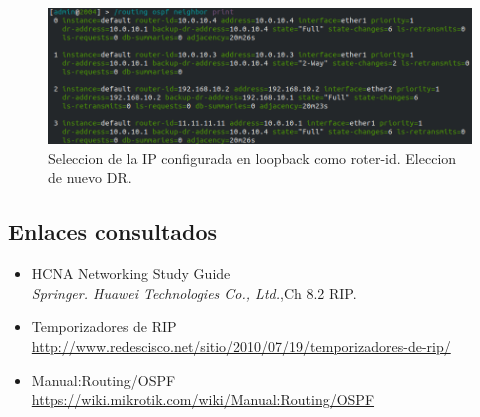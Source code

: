 \documentclass[letterpaper,12pt]{article}
\begin{document}
\begin{enumerate}
\begin{figure}[H]
			\centering \includegraphics[width=0.8\columnwidth]{figure/new_dr.png}
			\caption{
					\label{fig:samplesetup} %
					Seleccion de la IP configurada en loopback como roter-id. Eleccion de nuevo DR.
			}
		\end{figure} 
		
	\end{enumerate}

	\subsection{Enlaces consultados}
		\begin{itemize}
			\item{HCNA Networking Study Guide}  \\
			\textit{Springer. Huawei Technologies Co., Ltd.},Ch 8.2 RIP.
			\item{Temporizadores de RIP}  \\
			\url{http://www.redescisco.net/sitio/2010/07/19/temporizadores-de-rip/}

			\item{Manual:Routing/OSPF}  \\
			\url{https://wiki.mikrotik.com/wiki/Manual:Routing/OSPF}
		\end{itemize}
\end{document}
